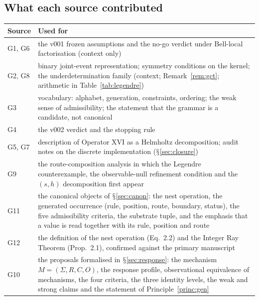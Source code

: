 \documentclass[11pt,a4paper]{article}
\renewcommand{\S}{\ensuremath{\mathsection}}
\theoremstyle{plain}
\theoremstyle{definition}
\begin{document}
\subsection{What each source contributed}
\begin{center}\small
\begin{tabularx}{\textwidth}{@{}l>{\raggedright\arraybackslash}X@{}}
\toprule
Source & Used for\\
\midrule
G1, G6 & the v001 frozen assumptions and the no-go verdict under Bell-local factorisation (context only)\\
G2, G8 & binary joint-event representation; symmetry conditions on the kernel; the underdetermination family (context; Remark~\ref{rem:gct}; arithmetic in Table~\ref{tab:legendre})\\
G3 & vocabulary: alphabet, generation, constraints, ordering; the weak sense of admissibility; the statement that the grammar is a candidate, not canonical\\
G4 & the v002 verdict and the stopping rule\\
G5, G7 & description of Operator XVI as a Helmholtz decomposition; audit notes on the discrete implementation (\S\ref{sec:closure})\\
G9 & the route-composition analysis in which the Legendre counterexample, the observable-null refinement condition and the $(s,h)$ decomposition first appear\\
G11 & the canonical objects of \S\ref{sec:canon}: the nest operation, the generated occurrence (rule, position, route, boundary, status), the five admissibility criteria, the substrate tuple, and the emphasis that a value is read together with its rule, position and route\\
G12 & the definition of the nest operation (Eq.~2.2) and the Integer Ray Theorem (Prop.~2.1), confirmed against the primary manuscript\\
G10 & the proposals formalised in \S\ref{sec:response}: the mechanism $M=(\Sigma,R,C,O)$, the response profile, observational equivalence of mechanisms, the four criteria, the three identity levels, the weak and strong claims and the statement of Principle~\ref{princ:gen}\\
\bottomrule
\end{tabularx}
\end{center}
\end{document}
